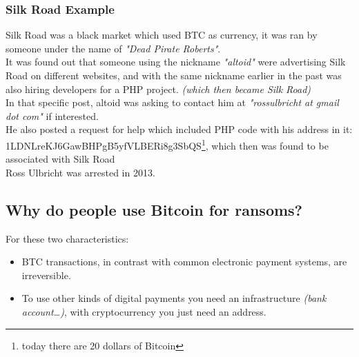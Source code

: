         \subsubsection{Silk Road Example}
            Silk Road was a black market which used BTC as currency, it was ran by someone under the name of \textit{"Dead Pirate Roberts"}.\\
            It was found out that someone using the nickname \textit{"altoid"} were advertising Silk Road on different websites, and with the same nickname earlier in the past was also hiring developers for a PHP project. \textit{(which then became Silk Road)}\\
            In that specific post, altoid was asking to contact him at \textit{"rossulbricht at gmail dot com"} if interested.\\
            He also posted a request for help which included PHP code with his address in it: 1LDNLreKJ6GawBHPgB5yfVLBERi8g3SbQS\footnote{today there are 20 dollars of Bitcoin}, which then was found to be associated with Silk Road\\
            Ross Ulbricht was arrested in 2013.
    \subsection{Why do people use Bitcoin for ransoms?}
        For these two characteristics:
        \begin{itemize}
            \item BTC transactions, in contrast with common electronic payment systems, are irreversible.
            \item To use other kinds of digital payments you need an infrastructure \textit{(bank account\dots)}, with cryptocurrency you just need an address.
        \end{itemize}
